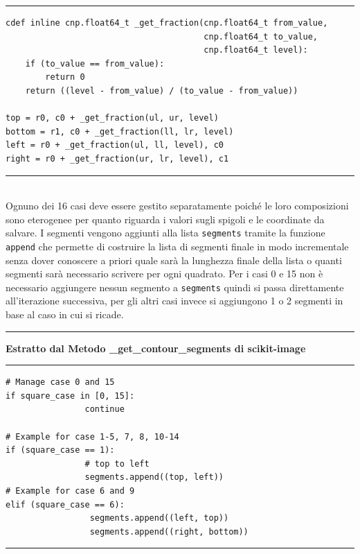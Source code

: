 \documentclass[12pt,a4paper]{report}
\begin{document}
\noindent\rule[0.5ex]{\linewidth}{1pt}
\begin{lstlisting}
cdef inline cnp.float64_t _get_fraction(cnp.float64_t from_value,
                                        cnp.float64_t to_value,
                                        cnp.float64_t level):
    if (to_value == from_value):
        return 0
    return ((level - from_value) / (to_value - from_value))

top = r0, c0 + _get_fraction(ul, ur, level)
bottom = r1, c0 + _get_fraction(ll, lr, level)
left = r0 + _get_fraction(ul, ll, level), c0
right = r0 + _get_fraction(ur, lr, level), c1
\end{lstlisting}
\noindent\rule[0.5ex]{\linewidth}{1pt} \\[10pt]
Ognuno dei 16 casi deve essere gestito separatamente poiché le loro composizioni sono eterogenee per quanto riguarda i valori sugli spigoli e le coordinate da salvare.  
I segmenti vengono aggiunti alla lista \verb|segments| tramite la funzione  \verb|append| che permette di costruire la lista di segmenti finale in modo incrementale senza dover conoscere a priori quale sarà la lunghezza finale della lista o quanti segmenti sarà necessario scrivere per ogni quadrato.  Per i casi 0 e 15 non è necessario aggiungere nessun segmento a \verb|segments| quindi si passa direttamente all'iterazione successiva, per gli altri casi invece si aggiungono 1 o 2 segmenti in base al caso in cui si ricade.\\[10pt]
\noindent\rule[0.5ex]{\linewidth}{2pt}
\small{\textbf{Estratto dal Metodo \_get\_contour\_segments di scikit-image}} \\
\noindent\rule[0.5ex]{\linewidth}{1pt}
\begin{lstlisting}
# Manage case 0 and 15
if square_case in [0, 15]:
                continue

# Example for case 1-5, 7, 8, 10-14
if (square_case == 1): 
                # top to left
                segments.append((top, left))
# Example for case 6 and 9
elif (square_case == 6):
                 segments.append((left, top))
                 segments.append((right, bottom))
\end{lstlisting}
\noindent\rule[0.5ex]{\linewidth}{1pt} \newpage

\end{document}
